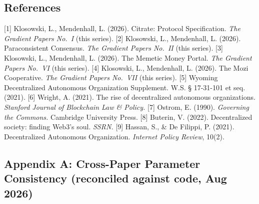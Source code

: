 \subsection{References}\label{references}

{[}1{]} Klosowski, L., Mendenhall, L. (2026). Citrate: Protocol
Specification. \emph{The Gradient Papers No.~I} (this series). {[}2{]}
Klosowski, L., Mendenhall, L. (2026). Paraconsistent Consensus.
\emph{The Gradient Papers No.~II} (this series). {[}3{]} Klosowski, L.,
Mendenhall, L. (2026). The Memetic Money Portal. \emph{The Gradient
Papers No.~VI} (this series). {[}4{]} Klosowski, L., Mendenhall, L.
(2026). The Mozi Cooperative. \emph{The Gradient Papers No.~VII} (this
series). {[}5{]} Wyoming Decentralized Autonomous Organization
Supplement. W.S. § 17-31-101 et seq. (2021). {[}6{]} Wright, A. (2021).
The rise of decentralized autonomous organizations. \emph{Stanford
Journal of Blockchain Law \& Policy.} {[}7{]} Ostrom, E. (1990).
\emph{Governing the Commons.} Cambridge University Press. {[}8{]}
Buterin, V. (2022). Decentralized society: finding Web3's soul.
\emph{SSRN.} {[}9{]} Hassan, S., \& De Filippi, P. (2021). Decentralized
Autonomous Organization. \emph{Internet Policy Review}, 10(2).

\subsection{Appendix A: Cross-Paper Parameter Consistency (reconciled
against code, Aug
2026)}\label{appendix-a-cross-paper-parameter-consistency-reconciled-against-code-aug-2026}

